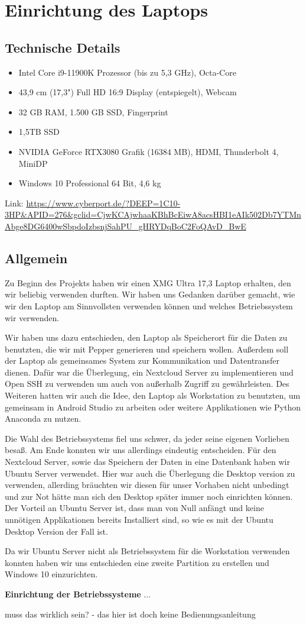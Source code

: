 \chapter{Einrichtung des Laptops}
\label{sec:laptop}

\section{Technische Details} %
\begin{itemize}
    \item Intel Core i9-11900K Prozessor (bis zu 5,3 GHz), Octa-Core
    \item 43,9 cm (17,3") Full HD 16:9 Display (entspiegelt), Webcam
    \item 32 GB RAM, 1.500 GB SSD, Fingerprint
    \item 1,5TB SSD
    \item NVIDIA GeForce RTX3080 Grafik (16384 MB), HDMI, Thunderbolt 4, MiniDP
    \item Windows 10 Professional 64 Bit, 4,6 kg
\end{itemize}


Link:
\url{https://www.cyberport.de/?DEEP=1C10-3HP&APID=276&gclid=CjwKCAjwhaaKBhBcEiwA8acsHBI1eAIk502Db7YTMnAbge8DG6400wSbpdoIzbsnjSahPU_gHRYDqBoC2FoQAvD_BwE}

\section{Allgemein}
Zu Beginn des Projekts haben wir einen XMG Ultra 17,3 Laptop erhalten, den wir beliebig verwenden durften. Wir haben uns Gedanken darüber gemacht, wie wir den Laptop am Sinnvollsten verwenden können und welches Betriebssystem wir verwenden. 

Wir haben uns dazu entschieden, den Laptop als Speicherort für die Daten zu benutzten, die wir mit Pepper generieren und speichern wollen. Außerdem soll der Laptop als gemeinsames System zur Kommunikation und Datentransfer dienen. Dafür war die Überlegung, ein Nextcloud Server zu implementieren und Open SSH zu verwenden um auch von außerhalb Zugriff zu gewährleisten. Des Weiteren hatten wir auch die Idee, den Laptop als Workstation zu benutzten, um gemeinsam in Android Studio zu arbeiten oder weitere Applikationen wie Python Anaconda zu nutzen. 

Die Wahl des Betriebssystems fiel uns schwer, da jeder seine eigenen Vorlieben besaß. Am Ende konnten wir uns allerdings eindeutig entscheiden. 
Für den Nextcloud Server, sowie das Speichern der Daten in eine Datenbank haben wir Ubuntu Server verwendet. Hier war auch die Überlegung die Desktop version zu verwenden, allerding bräuchten wir diesen für unser Vorhaben nicht unbedingt und zur Not hätte man sich den Desktop später immer noch einrichten können. Der Vorteil an Ubuntu Server ist, dass man von Null anfängt und keine unnötigen Applikationen bereits Installiert sind, so wie es mit der Ubuntu Desktop Version der Fall ist. 

Da wir Ubuntu Server nicht als Betriebssystem für die Workstation verwenden konnten haben wir uns entschieden eine zweite Partition zu erstellen und Windows 10 einzurichten.

\textbf{Einrichtung der Betriebssysteme}
...

muss das wirklich sein? - das hier ist doch keine Bedienungsanleitung